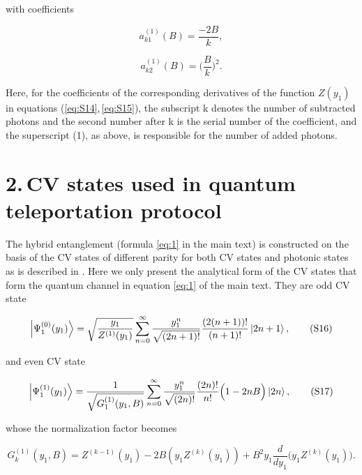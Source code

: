 \documentclass{optica-article}
\begin{document}
\!\!\!\!\!\!with coefficients    

\begin{equation}\label{eq:S14}
   a_{k1}^{(1)}(B) = \frac{-2B}{k}, 
\tag{S14}
\end{equation}


\begin{equation}\label{eq:S15}
   a_{k2}^{(1)}(B) = \Big(\frac{B}{k}\Big)^2. 
\tag{S15}
\end{equation}


\!\!\!\!\!\!Here, for the coefficients of the corresponding derivatives of the function $Z(y_1)$ in equations (\ref{eq:S14},\,\ref{eq:S15}), the subscript k denotes the number of subtracted photons and the second number after k is the serial number of the coefficient, and the superscript (1), as above, is responsible for the number of added photons.  


\section*{2.\,CV states used in quantum teleportation protocol  }

The hybrid entanglement (formula \eqref{eq:1}  in the main text) is constructed on the basis of the CV states of different parity for both CV states and photonic states as is described in \cite{2}. Here we only present the analytical form of the CV states that form the quantum channel in equation \eqref{eq:1}  of the main text. They are odd CV state  


\begin{equation}\label{eq:S16}
    \ket{\Psi_{1}^{(0)}(y_1)} =
    \sqrt{\frac{y_1}{Z^{(1)}(y_1)}}\sum_{n=0}^{\infty} \frac{y_1^{n}}{\sqrt{(2n+1)!}}\frac{(2(n+1))!}{(n+1)!}\ket{2n+1},  
\tag{S16}
\end{equation}

\!\!\!\!\!\!and even CV state

\begin{equation}\label{eq:S17}
    \ket{\Psi_{1}^{(1)}(y_1)} =
    \frac{1}{\sqrt{G_1^{(1)}(y_1,B)}}\sum_{n=0}^{\infty} \frac{y_1^{n}}{\sqrt{(2n)!}}\frac{(2n)!}{n!}\Big(1-2nB\Big)\ket{2n},  
\tag{S17}
\end{equation}


\!\!\!\!\!\!whose the normalization factor becomes 

\begin{equation}\label{eq:S18}
    G_{k}^{(1)}(y_1,B) = Z^{(k-1)}(y_1) - 2B(y_1Z^{(k)}(y_1)) + B^2y_1\frac{d}{dy_1}\Big(y_1Z^{(k)}(y_1)\Big). 
\tag{S18}
\end{equation}
\end{document}
